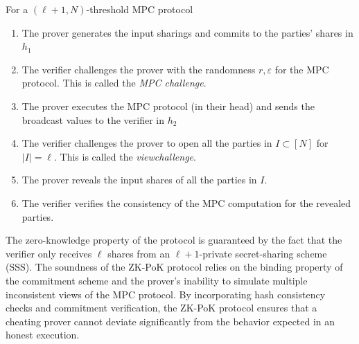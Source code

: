 \documentclass[11pt]{report}
\theoremstyle{definition}
\theoremstyle{plain}
\begin{document}
\begin{protocol}
  \label{pro:sdith-zkpok}
  For a $(\ell + 1, N)$-threshold MPC protocol
  \begin{enumerate}[parsep=0pt, itemsep=0pt, topsep=0pt]
    \item The prover generates the input sharings and commits to the parties' shares in $h_1$
    \item The verifier challenges the prover with the randomness \(r, \varepsilon\) for the MPC protocol. This is called the \textit{MPC challenge}.
    \item The prover executes the MPC protocol (in their head) and sends the broadcast values to the verifier in $h_2$
    \item The verifier challenges the prover to open all the parties in \(I \subset [N]\) for $|I| = \ell$. This is called the \textit{viewchallenge}.
    \item The prover reveals the input shares of all the parties in \(I\).
    \item The verifier verifies the consistency of the MPC computation for the revealed parties.
  \end{enumerate}
\end{protocol}

The zero-knowledge property of the protocol is guaranteed by the fact that the verifier only receives $\ell$ shares from an $\ell + 1$-private secret-sharing scheme (SSS).
The soundness of the ZK-PoK protocol relies on the binding property of the commitment scheme and the prover's inability to simulate multiple inconsistent views of the MPC protocol. By incorporating hash consistency checks and commitment verification, the ZK-PoK protocol ensures that a cheating prover cannot deviate significantly from the behavior expected in an honest execution.
\end{document}
